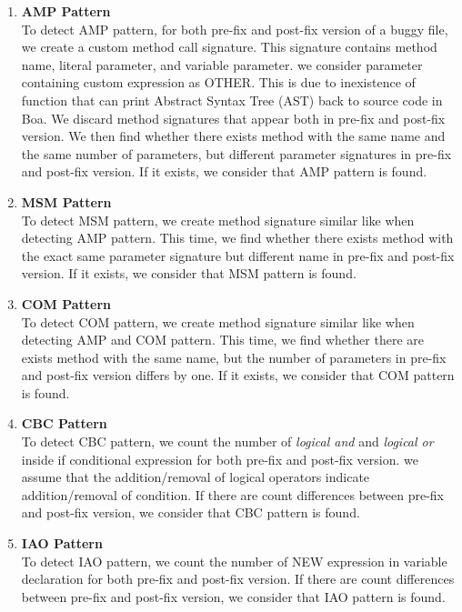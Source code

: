 \documentclass{sig-alternate-05-2015}
\begin{document}
\begin{enumerate}
\item {\bf AMP Pattern}\\
  To detect AMP pattern, for both pre-fix and post-fix version of a buggy file,
  we create a custom method call signature. This signature contains method name,
  literal parameter, and variable parameter. we consider parameter containing
  custom expression as OTHER. This is due to inexistence of function that can
  print Abstract Syntax Tree (AST) back to source code in Boa. We discard method
  signatures that appear both in pre-fix and post-fix version. We then find
  whether there exists method with the same name and the same number of
  parameters, but different parameter signatures in pre-fix and post-fix
  version. If it exists, we consider that AMP pattern is found.
	
\item {\bf MSM Pattern}\\
  To detect MSM pattern, we create method signature similar like when detecting
  AMP pattern. This time, we find whether there exists method with the exact
  same parameter signature but different name in pre-fix and post-fix
  version. If it exists, we consider that MSM pattern is found.
	
\item {\bf COM Pattern}\\
  To detect COM pattern, we create method signature similar like when detecting
  AMP and COM pattern. This time, we find whether there are exists method with
  the same name, but the number of parameters in pre-fix and post-fix version
  differs by one. If it exists, we consider that COM pattern is found.
	
\item {\bf CBC Pattern}\\
  To detect CBC pattern, we count the number of { \em logical and} and {\em
    logical or} inside if conditional expression for both pre-fix and post-fix
  version. we assume that the addition/removal of logical operators indicate
  addition/removal of condition. If there are count differences between pre-fix
  and post-fix version, we consider that CBC pattern is found.
	
\item {\bf IAO Pattern}\\
  To detect IAO pattern, we count the number of NEW expression in variable
  declaration for both pre-fix and post-fix version. If there are count
  differences between pre-fix and post-fix version, we consider that IAO pattern
  is found.
	

\end{enumerate}
\end{document}
